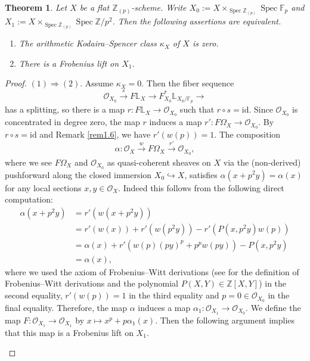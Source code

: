 \documentclass[11pt, a4paper]{amsart}
\theoremstyle{plain}
\newtheorem{theorem}{Theorem}[section]
\theoremstyle{definition}
\begin{document}
\begin{theorem}\label{thm3.2}
    Let $X$ be a flat $\mathbb Z_{(p)}$-scheme. Write $X_0:=X\times _{\operatorname{Spec}\mathbb Z_{(p)}}\operatorname{Spec}\mathbb F_p$ and  $X_1:=X\times _{\operatorname{Spec}\mathbb Z_{(p)}}\operatorname{Spec}\mathbb Z/p^2$. Then the following assertions are equivalent.\begin{enumerate}
        \item The arithmetic Kodaira--Spencer class $\kappa_X$ of $X$ is zero.
        \item There is a Frobenius lift on $X_1$.
    \end{enumerate}
\end{theorem}
\begin{proof}
    $(1)\Rightarrow (2)$. Assume $\kappa_X=0$. Then the fiber sequence \[\mathcal O_{X_0}\xrightarrow[]{s} F\mathbb L_X\to F_{X_0}^*\mathbb L_{X_0/\mathbb F_p}\to \] has a splitting, so there is a map $r:F\mathbb L_X\to \mathcal O_{X_0}$ such that $r\circ s=\mathrm{id}$. Since $\mathcal O_{X_0}$ is concentrated in degree zero, the map $r$ induces a map $r':F\Omega_X\to \mathcal O_{X_0}$. By $r\circ s=\mathrm{id}$ and Remark \ref{rem1.6}, we have $r'(w(p))=1$. The composition \[\alpha:\mathcal O_X\xrightarrow[]{w}F\Omega_X\xrightarrow[]{r'}\mathcal O_{X_0},\] where we see $F\Omega_X$ and $\mathcal O_{X_0}$ as quasi-coherent sheaves on $X$ via the (non-derived) pushforward along the closed immersion $X_0\hookrightarrow X$,  satisfies $\alpha(x+p^2y)=\alpha(x)$ for any local sections $x, y\in \mathcal O_X$. Indeed this follows from the following direct computation:\begin{align*}
        \alpha(x+p^2y)&=r'(w(x+p^2y))\\&=r'(w(x))+r'(w(p^2y))-r'(P(x,p^2y)w(p))\\&=\alpha(x)+r'(w(p)(py)^p+p^pw(py))-P(x,p^2y)\\&=\alpha(x),
    \end{align*}
    where we used the axiom of Frobenius--Witt derivations (see \cite[Definition 1.1]{Sai22} for the definition of Frobenius--Witt derivations and the polynomial $P(X,Y)\in \mathbb Z[X,Y]$) in the second equality, $r'(w(p))=1$ in the third equality and $p=0\in \mathcal O_{X_0}$ in the final equality. Therefore, the map $\alpha$ induces a map $\alpha_1:\mathcal O_{X_1}\to \mathcal O_{X_0}$. We define the map $F:\mathcal O_{X_1}\to \mathcal O_{X_1}$ by $x\mapsto x^p+p\alpha_1(x)$. Then the following argument implies that this map is a Frobenius lift on $X_1$.
    \begin{itemize}

\end{itemize}
\end{proof}
\end{document}
